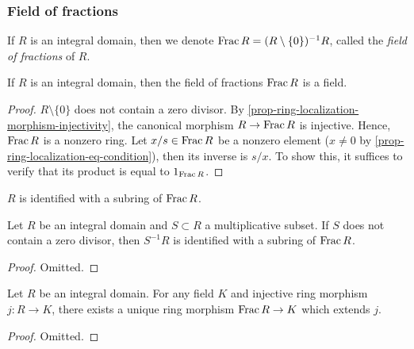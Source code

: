 \documentclass[12pt]{report}
\begin{document}
\subsubsection{Field of fractions}

\begin{definition} \label{def-fraction-field}
    If $R$ is an integral domain, then we denote $\operatorname{Frac} R = (R \setminus \lbrace 0 \rbrace)^{-1} R$, called the \emph{field of fractions} of $R$.
\end{definition}

\begin{proposition} \label{prop-ring-fraction-field}
    If $R$ is an integral domain, then the field of fractions $\operatorname{Frac} R$ is a field.
\end{proposition}

\begin{proof}
    $R \setminus \lbrace 0 \rbrace$ does not contain a zero divisor. By \ref{prop-ring-localization-morphism-injectivity}, the canonical morphism $R \to \operatorname{Frac} R$ is injective. Hence, $\operatorname{Frac} R$ is a nonzero ring. Let $x / s \in \operatorname{Frac} R$ be a nonzero element ($x \neq 0$ by \ref{prop-ring-localization-eq-condition}), then its inverse is $s / x$. To show this, it suffices to verify that its product is equal to $1_{\operatorname{Frac} R}$.
\end{proof}

\begin{remark}
    $R$ is identified with a subring of $\operatorname{Frac} R$.
\end{remark}

\begin{proposition}
    Let $R$ be an integral domain and $S \subset R$ a multiplicative subset. If $S$ does not contain a zero divisor, then $S^{-1} R$ is identified with a subring of $\operatorname{Frac} R$.
\end{proposition}

\begin{proof}
    Omitted.
\end{proof}

\begin{proposition}
    Let $R$ be an integral domain. For any field $K$ and injective ring morphism $j \colon R \to K$, there exists a unique ring morphism $\operatorname{Frac} R \to K$ which extends $j$.
\end{proposition}

\begin{proof}
    Omitted.
\end{proof}
\end{document}
